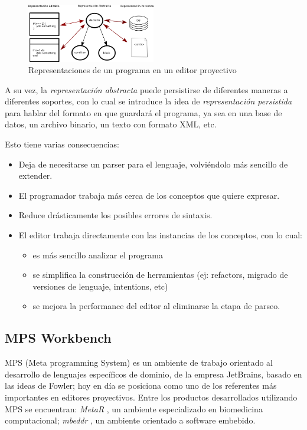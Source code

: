 \begin{figure}
  \begin{center}
    \includegraphics[width=0.5\textwidth,keepaspectratio]{assets/projectional-editor.png}
    \caption{Representaciones de un programa en un editor proyectivo}
  \end{center}
\end{figure}

A su vez, la \textit{representación abstracta} puede persistirse de diferentes maneras a diferentes soportes, con lo cual se introduce la idea de \textit{representación persistida} para hablar del formato en que guardará el programa, ya sea en una base de datos, un archivo binario, un texto con formato XML, etc.


Esto tiene varias consecuencias:
\begin{itemize}
  \item Deja de necesitarse un parser para el lenguaje, volviéndolo más sencillo de extender.
  \item El programador trabaja más cerca de los conceptos que quiere expresar.
  \item Reduce drásticamente los posibles errores de sintaxis.
  \item El editor trabaja directamente con las instancias de los conceptos, con lo cual:
  \begin{itemize}
    \item es más sencillo analizar el programa
    \item se simplifica la construcción de herramientas (ej: refactors, migrado de versiones de lenguaje, intentions, etc)
    \item se mejora la performance del editor al eliminarse la etapa de parseo.
  \end{itemize}
\end{itemize}


\subsection{MPS Workbench}

MPS (Meta programming System)\cite{MPS} es un ambiente de trabajo orientado al desarrollo de lenguajes específicos de dominio, de la empresa JetBrains, basado en las ideas de Fowler; hoy en día se posiciona como uno de los referentes más importantes en editores proyectivos\cite{LanguageModularity}. 
Entre los productos desarrollados utilizando MPS se encuentran: \textit{MetaR} \cite{MetaR}, un ambiente especializado en biomedicina computacional; \textit{mbeddr} \cite{mbeddr}, un ambiente orientado a software embebido.

